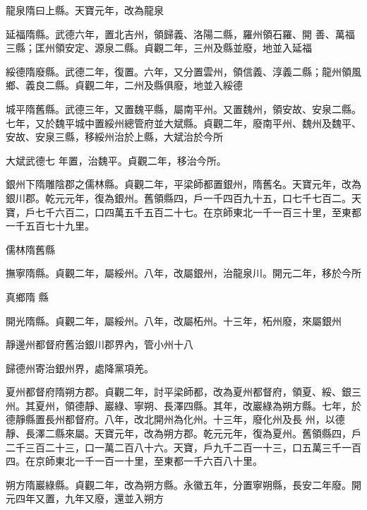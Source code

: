 \begin{pinyinscope}
 龍泉隋曰上縣。天寶元年，改為龍泉



 延福隋縣。武德六年，置北吉州，領歸義、洛陽二縣，羅州領石羅、開
 善、萬福三縣；匡州領安定、源泉二縣。貞觀二年，三州及縣並廢，地並入延福



 綏德隋廢縣。武德二年，復置。六年，又分置雲州，領信義、淳義二縣；龍州領風鄉、義良二縣。貞觀二年，二州及縣俱廢，地並入綏德



 城平隋舊縣。武德三年，又置魏平縣，屬南平州。又置魏州，領安故、安泉二縣。七年，又於魏平城中置綏州總管府並大斌縣。貞觀二年，廢南平州、魏州及魏平、安故、安泉三縣，移綏州治於上縣，大斌治於今所



 大斌武德七
 年置，治魏平。貞觀二年，移治今所。



 銀州下隋雕陰郡之儒林縣。貞觀二年，平梁師都置銀州，隋舊名。天寶元年，改為銀川郡。乾元元年，復為銀州。舊領縣四，戶一千四百九十五，口七千七百二。天寶，戶七千六百二，口四萬五千五百二十七。在京師東北一千一百三十里，至東都一千五百七十九里。



 儒林隋舊縣



 撫寧隋縣。貞觀二年，屬綏州。八年，改屬銀州，治龍泉川。開元二年，移於今所



 真鄉隋
 縣



 開光隋縣。貞觀二年，屬綏州。八年，改屬柘州。十三年，柘州廢，來屬銀州



 靜邊州都督府舊治銀川郡界內，管小州十八



 歸德州寄治銀州界，處降黨項羌。



 夏州都督府隋朔方郡。貞觀二年，討平梁師都，改為夏州都督府，領夏、綏、銀三州。其夏州，領德靜、巖綠、寧朔、長澤四縣。其年，改巖綠為朔方縣。七年，於德靜縣置長州都督府。八年，改北開州為化州。十三年，廢化州及長
 州，以德靜、長澤二縣來屬。天寶元年，改為朔方郡。乾元元年，復為夏州。舊領縣四，戶二千三百二十三，口一萬二百八十六。天寶，戶九千二百一十三，口五萬三千一百四。在京師東北一千一百一十里，至東都一千六百八十里。



 朔方隋巖綠縣。貞觀二年，改為朔方縣。永徽五年，分置寧朔縣，長安二年廢。開元四年又置，九年又廢，還並入朔方




\end{pinyinscope}
